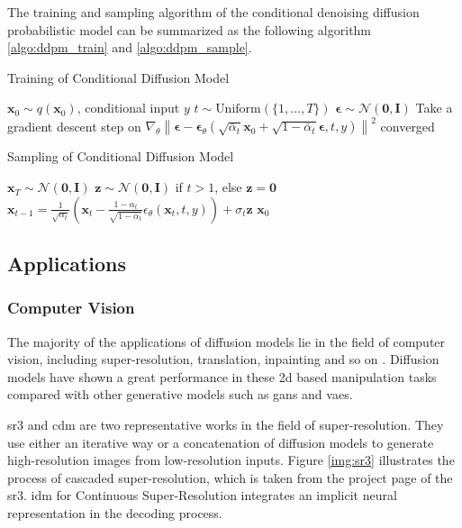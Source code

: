 \documentclass[12pt,DIV14,BCOR12mm,a4paper,footinclude=false,headinclude,parskip=half-,twoside,openright,cleardoublepage=empty,toc=index,bibliography=totoc,listof=totoc]{scrreprt}
\numberwithin{equation}{chapter}
\begin{document}
The training and sampling algorithm of the conditional denoising diffusion probabilistic model can be summarized as the following algorithm \ref{algo:ddpm_train} and \ref{algo:ddpm_sample}.
\begin{algorithm}[H]
  \caption{Training of Conditional Diffusion Model}
  \label{algo:ddpm_train}
  \begin{algorithmic}[1]
    \Repeat
      \State $\mathbf{x}_{0}\sim q(\mathbf{x}_{0})$, conditional input $y$
      \State $t\sim \text{Uniform}(\{1,...,T\})$
      \State $\mathbf{\epsilon}\sim \mathcal{N} (\mathbf{0}, \mathbf{I})$
      \State Take a gradient descent step on $\nabla_{\theta}\left\lVert\boldsymbol{\epsilon} - \boldsymbol{\epsilon}_{\theta}(\sqrt{\bar{\alpha}_{t}}\mathbf{x}_{0} + \sqrt{1 - \bar{\alpha}_{t}}\boldsymbol{\epsilon}, t, y)\right\rVert ^{2}$ 
    \Until converged
  \end{algorithmic}
\end{algorithm}
\begin{algorithm}[H]
  \caption{Sampling of Conditional Diffusion Model}
  \label{algo:ddpm_sample}
  \begin{algorithmic}[1]
    \State $\mathbf{x}_{T}\sim \mathcal{N} (\mathbf{0}, \mathbf{I})$
      \State $\mathbf{z}\sim \mathcal{N} (\mathbf{0}, \mathbf{I})$ if $t>1$, else $\mathbf{z} = \mathbf{0}$
      \State $\mathbf{x}_{t-1}=\frac{1}{\sqrt{\alpha_{t}}}\left(\mathbf{x}_{t} - \frac{1-\alpha_{t}}{\sqrt{1-\bar{\alpha}_{t}}}\epsilon_{\theta}(\mathbf{x}_{t},t,y)\right) + \sigma_{t}\mathbf{z}$
    \EndFor
    \State \Return $\mathbf{x}_{0}$
  \end{algorithmic}
\end{algorithm}

\subsection{Applications}

\subsubsection{Computer Vision}
The majority of the applications of diffusion models lie in the field of computer vision, including super-resolution, translation, inpainting and so on  \cite{yang2023diffusion}. Diffusion models have shown a great performance in these \gls{2d} based manipulation tasks compared with other generative models such as \glspl{gan} and \glspl{vae}.

\gls{sr3} \cite{saharia2021image} and \gls{cdm} \cite{ho2021cascaded} are two representative works in the field of super-resolution. They use either an iterative way or a concatenation of diffusion models to generate high-resolution images from low-resolution inputs. Figure \ref{img:sr3} illustrates the process of cascaded super-resolution, which is taken from the project page of the \gls{sr3}. \gls{idm} for Continuous Super-Resolution \cite{gao2023implicit} integrates an implicit neural representation in the decoding process.
\end{document}
